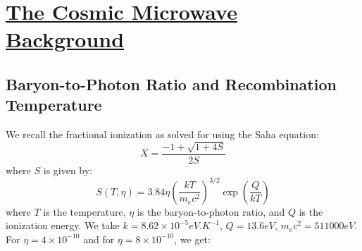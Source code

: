 \section[The Cosmic Microwave Background]{\hyperlink{toc}{The Cosmic Microwave Background}}

\subsection{Baryon-to-Photon Ratio and Recombination Temperature}
We recall the fractional ionization as solved for using the Saha equation:
\begin{equation}
    X = \frac{-1 + \sqrt{1 + 4S}}{2S}
\end{equation}
where $S$ is given by:
\begin{equation}
    S(T, \eta) = 3.84\eta\left(\frac{kT}{m_e c^2}\right)^{3/2}\exp(\frac{Q}{kT})
\end{equation}
where $T$ is the temperature, $\eta$ is the baryon-to-photon ratio, and $Q$ is the ionization energy. We take $k = 8.62 \times 10^{-5}\si{eV.K^{-1}}$, $Q = 13.6\si{eV}$, $m_e c^2 = 511000\si{eV}$. For $\eta = 4 \times 10^{-10}$ and for $\eta = 8 \times 10^{-10}$, we get:
